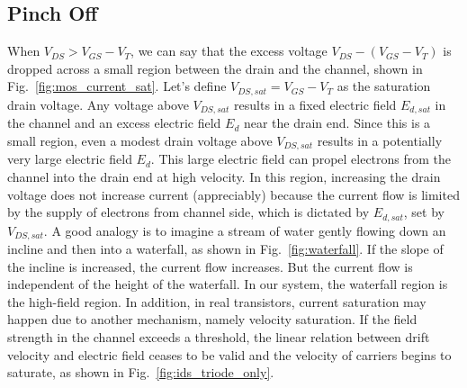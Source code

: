 \subsection{Pinch Off}
When $V_{DS} > V_{GS}-V_T$, we can say that the excess voltage $V_{DS} - (V_{GS}-V_T)$ is dropped across a small region between the drain and the channel, shown in Fig.~\ref{fig:mos_current_sat}.  Let's define $V_{DS,sat} = V_{GS}-V_T$ as the saturation drain voltage.  Any voltage above $V_{DS,sat}$ results in a fixed electric field $E_{d,sat}$ in the channel and an excess electric field $E_{d}$ near the drain end.  Since this is a small region, even a modest drain voltage above $V_{DS,sat}$ results in a potentially very large electric field $E_d$.  This large electric field can propel electrons from the channel into the drain end at high velocity.  In this region, increasing the drain voltage does not increase current (appreciably) because the current flow is limited by the supply of electrons from channel side, which is dictated by $E_{d,sat}$, set by $V_{DS,sat}$.  A good analogy is to imagine a stream of water gently flowing down an incline and then into a waterfall, as shown in Fig.~\ref{fig:waterfall}.  If the slope of the incline is increased, the current flow increases.  But the current flow is independent of the height of the waterfall.  In our system, the waterfall region is the high-field region.  
In addition, in real transistors, current saturation may happen due to another mechanism, namely velocity saturation. If the field strength in the channel exceeds a threshold, the linear relation between drift velocity and electric field ceases to be valid and the velocity of carriers begins to saturate, as shown in Fig.~\ref{fig:ids_triode_only}.
